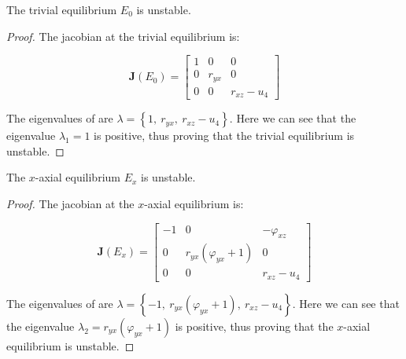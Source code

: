 \begin{theorem}\label{thm:eq-trivial-stability}
    The trivial equilibrium $E_0$ is unstable.
\end{theorem}
\begin{proof}
    The jacobian at the trivial equilibrium is:

    \begin{equation}\label{matrix:jacobian-trivial}
        \textbf{J}\left(E_0\right) = \begin{bmatrix}
            1 & 0 & 0\\
            0 & r_{yx} & 0\\
            0 & 0 & r_{xz}-u_4
        \end{bmatrix}
    \end{equation}

    The eigenvalues of  are $\lambda=\left\{1,\ r_{yx},\ r_{xz}-u_4\right\}$. Here we can see that the eigenvalue $\lambda_1=1$ is positive, thus proving that the trivial equilibrium is unstable.
\end{proof}

\begin{theorem}\label{thm:eq-axial-x-stability}
    The $x$-axial equilibrium $E_x$ is unstable.
\end{theorem}
\begin{proof}
    The jacobian at the $x$-axial equilibrium is:

    \begin{equation}\label{matrix:jacobian-axial-x}
        \textbf{J}\left(E_x\right) = \begin{bmatrix}
            -1 & 0 & -\varphi_{xz}\\
            0 & r_{yx}\left(\varphi_{yx}+1\right) & 0\\
            0 & 0 & r_{xz}-u_4
        \end{bmatrix}
    \end{equation}

    The eigenvalues of  are $\lambda=\left\{-1,\ r_{yx}\left(\varphi_{yx}+1\right),\ r_{xz}-u_4\right\}$. Here we can see that the eigenvalue $\lambda_2=r_{yx}\left(\varphi_{yx}+1\right)$ is positive, thus proving that the $x$-axial equilibrium is unstable.
\end{proof}

